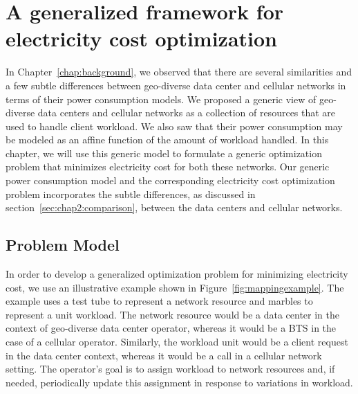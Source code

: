 \chapter{A generalized framework for electricity cost optimization}
\label{chap:framework} In Chapter~\ref{chap:background}, we observed that there are several similarities and a few subtle differences between geo-diverse data center and cellular networks in terms of their power consumption models. We proposed a generic view of geo-diverse data centers and cellular networks as a collection of resources that are used to handle client workload. We also saw that their power consumption may be modeled as an affine function of the amount of workload handled. In this chapter, we will use this generic model to formulate a generic optimization problem that minimizes electricity cost for both these networks. Our generic power consumption model and the corresponding electricity cost optimization problem incorporates the subtle differences, as discussed in section~\ref{sec:chap2:comparison}, between the data centers and cellular networks.


\section{Problem Model} %
In order to develop a generalized optimization problem for minimizing electricity cost, we use an illustrative example shown in Figure~\ref{fig:mappingexample}. The example uses a test tube to represent a network resource and marbles to represent a unit workload. The network resource would be a data center in the context of geo-diverse data center operator, whereas it would be a BTS in the case of a cellular operator. Similarly, the workload unit would be a client request in the data center context, whereas it would be a call in a cellular network setting. The operator's goal is to assign workload to network resources and, if needed, periodically update this assignment in response to variations in workload.

